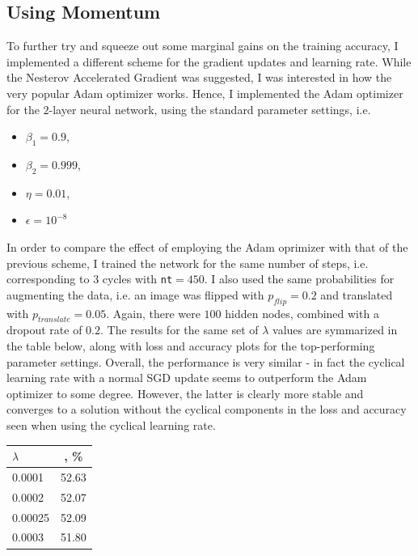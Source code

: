 \documentclass{article}
\begin{document}
\subsection*{Using Momentum}
	To further try and squeeze out some marginal gains on the training accuracy, I implemented a different scheme for the gradient updates and learning rate. While the Nesterov Accelerated Gradient was suggested, I was interested in how the very popular Adam optimizer works. Hence, I implemented the Adam optimizer for the $2$-layer neural network, using the standard parameter settings, i.e. 
	\begin{itemize}
		\item $\beta_1 = 0.9$,
		\item $\beta_2 = 0.999$,
		\item $\eta = 0.01$,
		\item $\epsilon = 10^{-8}$
	\end{itemize}
	In order to compare the effect of employing the Adam oprimizer with that of the previous scheme, I trained the network for the same number of steps, i.e. corresponding to $3$ cycles with \texttt{nt}$=450$. I also used the same probabilities for augmenting the data, i.e. an image was flipped with $p_{flip} = 0.2$ and translated with $p_{translate} = 0.05$. Again, there were $100$ hidden nodes, combined with a dropout rate of $0.2$. The results for the same set of $\lambda$ values are symmarized in the table below, along with loss and accuracy plots for the top-performing parameter settings. Overall, the performance is very similar - in fact the cyclical learning rate with a normal SGD update seems to outperform the Adam optimizer to some degree. However, the latter is clearly more stable and converges to a solution without the cyclical components in the loss and accuracy seen when using the cyclical learning rate. 
	\vspace{0.3cm}
	\begin{center}	
	\begin{tabular}{|l|c|}
		\hline
		 $\lambda$ & \text{Accuracy}, \% \\ \hline
		0.0001 & 52.63\\ 
		0.0002 & 52.07\\
		0.00025 & 52.09\\
		0.0003 & 51.80\\\hline
	\end{tabular}
	\end{center}
\end{document}

